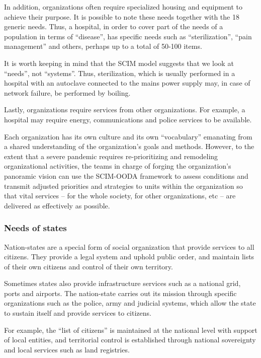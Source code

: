 \documentclass[12pt, a4]{scrartcl}
\begin{document}
In addition, organizations often require specialized housing and equipment to achieve their purpose. It is possible to note these needs together with the 18 generic needs. Thus, a hospital, in order to cover part of the needs of a population in terms of “disease”, has specific needs such as “sterilization”, “pain management” and others, perhaps up to a total of 50-100 items. 

It is worth keeping in mind that the SCIM model suggests that we look at “needs”, not “systems”. Thus, sterilization, which is usually performed in a hospital with an autoclave connected to the mains power supply may, in case of network failure, be performed by boiling. 

Lastly, organizations require services from other organizations. For example, a hospital may require energy, communications and police services to be available.

Each organization has its own culture and its own “vocabulary” emanating from a shared understanding of the organization's goals and methods. However, to the extent that a severe pandemic requires re-prioritizing and remodeling organizational activities, the teams in charge of forging the organization's panoramic vision can use the SCIM-OODA framework to assess conditions and transmit adjusted priorities and strategies to units within the organization so that vital services – for the whole society, for other organizations, etc – are delivered as effectively as possible.

\subsubsection{Needs of states}

Nation-states are a special form of social organization that provide services to all citizens. They provide a legal system and uphold public order, and maintain lists of their own citizens and control of their own territory.

Sometimes states also provide infrastructure services such as a national grid, ports and airports. The nation-state carries out its mission through specific organizations such as the police, army and judicial systems, which allow the state to sustain itself and provide services to citizens.

For example, the “list of citizens” is maintained at the national level with support of local entities, and territorial control is established through national sovereignty and local services such as land registries. 
\end{document}

